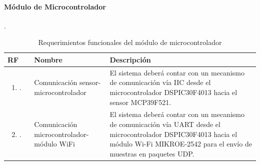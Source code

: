 \paragraph{Módulo de Microcontrolador}.
\begin{longtable}{|M{1.6cm}|M{4.0cm}|M{6.0cm}|}
    \caption{Requerimientos funcionales del módulo de microcontrolador}
	\hline
	\textbf{RF} & \textbf{Nombre} & \textbf{Descripción} \\ 
	\hline
 	\begin{enumerate}[label=RF\arabic*]
 	    \item.
 	\end{enumerate}
 	& Comunicación sensor-microcontrolador
 	& El sistema deberá contar con un mecanismo de comunicación vía IIC desde el microcontrolador DSPIC30F4013 hacia el sensor MCP39F521. \\
    \hline
    \begin{enumerate}[label=RF\arabic*]
        \setcounter{enumi}{1}
 	    \item.
 	\end{enumerate}
 	& Comunicación microcontrolador-módulo WiFi
 	& El sistema deberá contar con un mecanismo de comunicación vía UART desde el microcontrolador DSPIC30F4013 hacia el módulo Wi-Fi MIKROE-2542 para el envío de muestras en paquetes UDP. \\
    \hline
\end{longtable}



